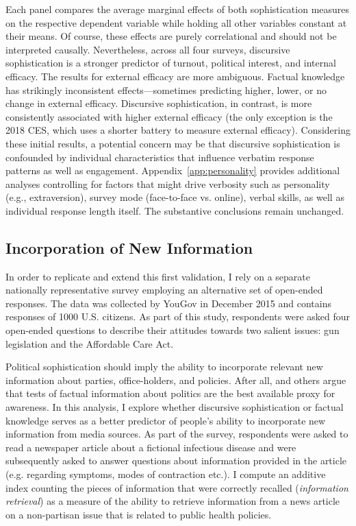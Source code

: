 Each panel compares the average marginal effects of both sophistication measures on the respective dependent variable while holding all other variables constant at their means. Of course, these effects are purely correlational and should not be interpreted causally. Nevertheless, across all four surveys, discursive sophistication is a stronger predictor of turnout, political interest, and internal efficacy. The results for external efficacy are more ambiguous. Factual knowledge has strikingly inconsistent effects---sometimes predicting higher, lower, or no change in external efficacy. Discursive sophistication, in contrast, is more consistently associated with higher external efficacy (the only exception is the 2018 CES, which uses a shorter battery to measure external efficacy). Considering these initial results, a potential concern may be that discursive sophistication is confounded by individual characteristics that influence verbatim response patterns as well as engagement. Appendix~\ref{app:personality} provides additional analyses controlling for factors that might drive verbosity such as personality (e.g., extraversion), survey mode (face-to-face vs. online), verbal skills, as well as individual response length itself. The substantive conclusions remain unchanged.


\subsection*{Incorporation of New Information}
In order to replicate and extend this first validation, I rely on a separate nationally representative survey employing an alternative set of open-ended responses. The data was collected by YouGov in December 2015 and contains responses of 1000 U.S. citizens. %
As part of this study, respondents were asked four open-ended questions to describe their attitudes towards two salient issues: gun legislation and the Affordable Care Act.


Political sophistication should imply the ability to incorporate relevant new information about parties, office-holders, and policies. After all,  \citet{zaller1990political,zaller1992nature} and others argue that tests of factual information about politics are the best available proxy for awareness. In this analysis, I explore whether discursive sophistication or factual knowledge serves as a better predictor of people's ability to incorporate new information from media sources. As part of the survey, respondents were asked to read a newspaper article about a fictional infectious disease and were subsequently asked to answer questions about information provided in the article (e.g. regarding symptoms, modes of contraction etc.). I compute an additive index counting the pieces of information that were correctly recalled (\textit{information retrieval}) as a measure of the ability to retrieve information from a news article on a non-partisan issue that is related to public health policies. 

